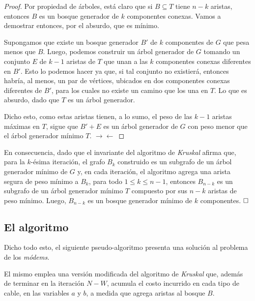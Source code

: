 \begin{proof}
Por propiedad de árboles, está claro que si $B \subseteq T$ tiene $n - k$ aristas, entonces $B$ es un bosque generador de $k$ componentes conexas. Vamos a demostrar entonces, por el absurdo, que es mínimo.

Supongamos que existe un bosque generador $B'$ de $k$ componentes de $G$ que pesa menos que $B$. Luego, podemos construir un árbol generador de $G$ tomando un conjunto $E$ de $k-1$ aristas de $T$ que unan a las $k$ componentes conexas diferentes en $B'$. Esto lo podemos hacer ya que, si tal conjunto no existierá, entonces habría, al menos, un par de vértices, ubicados en dos componentes conexas diferentes de $B'$, para los cuales no existe un camino que los una en $T$. Lo que es absurdo, dado que $T$ es un árbol generador.

Dicho esto, como estas aristas tienen, a lo sumo, el peso de las $k-1$ aristas máximas en $T$, sigue que $B' + E$ es un árbol generador de $G$ con peso menor que el árbol generador mínimo $T$. $\rightarrow\leftarrow$  
\end{proof}
En consecuencia, dado que el invariante del algoritmo de \textit{Kruskal} afirma que, para la $k$-ésima iteración, el grafo $B_k$ construido es un subgrafo de un árbol generador mínimo de $G$ y, en cada iteración, el algoritmo agrega una arista segura de peso mínimo a $B_k$, para todo $1 \leq k \leq n-1$, entonces $B_{n-k}$ es un subgrafo de un árbol generador mínimo $T$ compuesto por sus $n-k$ aristas de peso mínimo. Luego, $B_{n-k}$ es un bosque generador mínimo de $k$ componentes. $\hfill \square$

\subsection{El algoritmo} Dicho todo esto, el siguiente pseudo-algoritmo presenta una solución al problema de los \textit{módems}. %



El mismo emplea una versión modificada del algoritmo de \textit{Kruskal} que, además de terminar en la iteración $N - W$, acumula el costo incurrido en cada tipo de cable, en las variables $a$ y $b$, a medida que agrega aristas al bosque $B$. %

